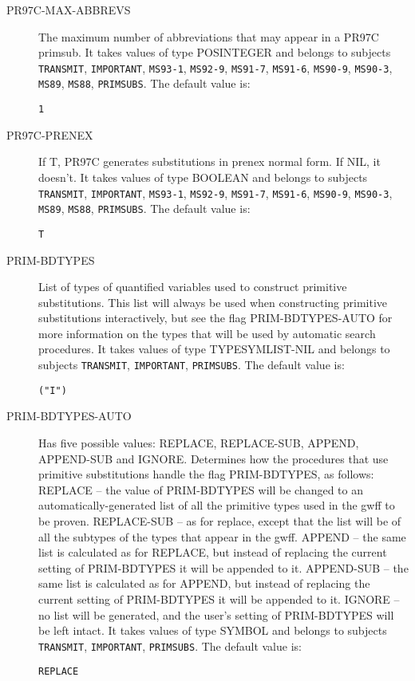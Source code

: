 \begin{description}
\item[PR97C-MAX-ABBREVS]  
The maximum number of abbreviations that may appear in a PR97C primsub.
It takes values of type POSINTEGER and belongs to subjects \texttt{TRANSMIT}, \texttt{IMPORTANT}, \texttt{MS93-1}, \texttt{MS92-9}, \texttt{MS91-7}, \texttt{MS91-6}, \texttt{MS90-9}, \texttt{MS90-3}, \texttt{MS89}, \texttt{MS88}, \texttt{PRIMSUBS}.  The default value is: \begin{lstlisting}
1
\end{lstlisting}

\item[PR97C-PRENEX]  
If T, PR97C generates substitutions in prenex normal form. If NIL, it doesn't.
It takes values of type BOOLEAN and belongs to subjects \texttt{TRANSMIT}, \texttt{IMPORTANT}, \texttt{MS93-1}, \texttt{MS92-9}, \texttt{MS91-7}, \texttt{MS91-6}, \texttt{MS90-9}, \texttt{MS90-3}, \texttt{MS89}, \texttt{MS88}, \texttt{PRIMSUBS}.  The default value is: \begin{lstlisting}
T
\end{lstlisting}

\item[PRIM-BDTYPES]  
List of types of quantified variables used to construct primitive
substitutions. This list will always be used when constructing primitive
substitutions interactively, but see the flag PRIM-BDTYPES-AUTO for more
information on the types that will be used by automatic search procedures.
It takes values of type TYPESYMLIST-NIL and belongs to subjects \texttt{TRANSMIT}, \texttt{IMPORTANT}, \texttt{PRIMSUBS}.  The default value is: \begin{lstlisting}
("I")
\end{lstlisting}

\item[PRIM-BDTYPES-AUTO]  
Has five possible values: REPLACE, REPLACE-SUB, APPEND, 
APPEND-SUB and IGNORE.
Determines how the procedures that use primitive substitutions
handle the flag PRIM-BDTYPES, as follows:
REPLACE -- the value of PRIM-BDTYPES will be changed to an 
automatically-generated list of all the primitive types used in 
the gwff to be proven.
REPLACE-SUB -- as for replace, except that the list will be of all
the subtypes of the types that appear in the gwff.
APPEND -- the same list is calculated as for REPLACE, but instead
of replacing the current setting of PRIM-BDTYPES it will be appended
to it.
APPEND-SUB -- the same list is calculated as for APPEND, but instead
of replacing the current setting of PRIM-BDTYPES it will be appended
to it.
IGNORE -- no list will be generated, and the user's setting of 
PRIM-BDTYPES will be left intact.
It takes values of type SYMBOL and belongs to subjects \texttt{TRANSMIT}, \texttt{IMPORTANT}, \texttt{PRIMSUBS}.  The default value is: \begin{lstlisting}
REPLACE
\end{lstlisting}


\end{description}
